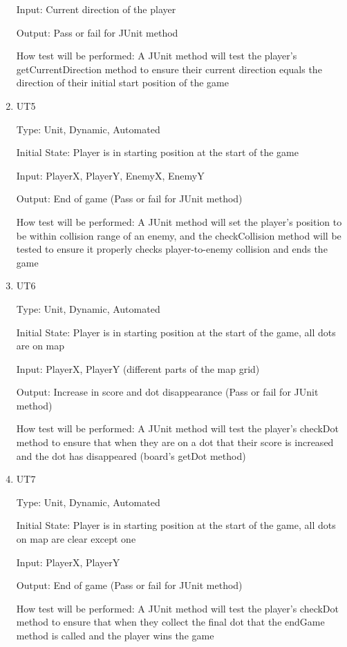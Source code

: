 \documentclass[12pt, titlepage]{article}
\begin{document}
\begin{enumerate}
Input: Current direction of the player
					
Output: Pass or fail for JUnit method
					
How test will be performed: A JUnit method will test the player's getCurrentDirection method to ensure their current direction equals the direction of their initial start position of the game

\item{UT5\\}

Type: Unit, Dynamic, Automated
					
Initial State: Player is in starting position at the start of the game
					
Input: PlayerX, PlayerY, EnemyX, EnemyY
					
Output: End of game (Pass or fail for JUnit method)
					
How test will be performed: A JUnit method will set the player's position to be within collision range of an enemy, and the checkCollision method will be tested to ensure it properly checks player-to-enemy collision and ends the game

\item{UT6\\}

Type: Unit, Dynamic, Automated
					
Initial State: Player is in starting position at the start of the game, all dots are on map
					
Input: PlayerX, PlayerY (different parts of the map grid)
					
Output: Increase in score and dot disappearance (Pass or fail for JUnit method)
					
How test will be performed: A JUnit method will test the player's checkDot method to ensure that when they are on a dot that their score is increased and the dot has disappeared (board's getDot method)

\item{UT7\\}

Type: Unit, Dynamic, Automated
					
Initial State: Player is in starting position at the start of the game, all dots on map are clear except one
					
Input: PlayerX, PlayerY
					
Output: End of game (Pass or fail for JUnit method)
					
How test will be performed: A JUnit method will test the player's checkDot method to ensure that when they collect the final dot that the endGame method is called and the player wins the game

\end{enumerate}
		
\end{document}
